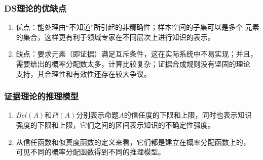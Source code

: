 \documentclass[12pt]{article}
\begin{document}
\subsubsection{DS理论的优缺点}
\begin{enumerate}
	\item 优点：能处理由“不知道”所引起的非精确性；样本空间的子集可以是多个
		元素的集合，这样更有利于领域专家在不同层次上进行知识的表示。
	\item 缺点：要求元素（即证据）满足互斥条件，这在实际系统中不易实现；并且，
		需要给出的概率分配数太多，计算比较复杂；证据合成规则没有坚固的理论
		支持，其合理性和有效性还存在较大争议。
\end{enumerate}
\subsubsection{证据理论的推理模型}
\begin{enumerate}
	\item $Bel(A)$和$Pl(A)$分别表示命题$A$的信任度的下限和上限，同时也表示知识
		强度的下限和上限，它们之间的区间表示知识的不确定性强度。
	\item 从信任函数和似真度函数的定义来看，它们都是建立在概率分配函数上的，
		可见不同的概率分配函数得到不同的推理模型。
\end{enumerate}
\end{document}
